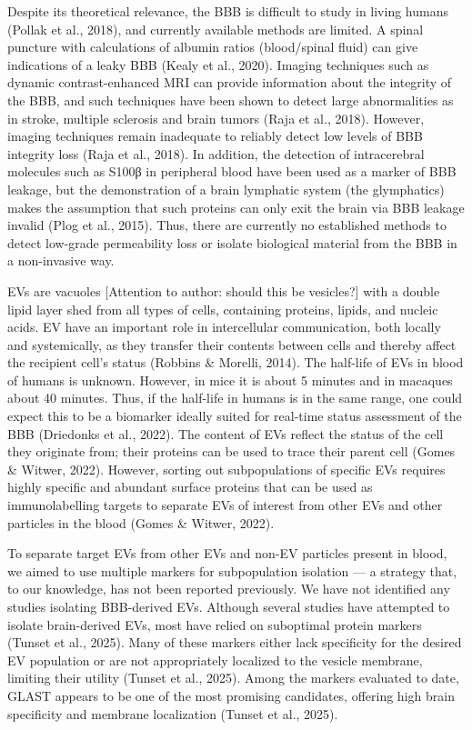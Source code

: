 \documentclass[authordate, empirical]{jote-new-article}
\begin{document}
	Despite its theoretical relevance, the BBB is difficult to study in living humans (Pollak et al., 2018), and currently available methods are limited. A spinal puncture with calculations of albumin ratios (blood/spinal fluid) can give indications of a leaky BBB (Kealy et al., 2020). Imaging techniques such as dynamic contrast-enhanced MRI can provide information about the integrity of the BBB, and such techniques have been shown to detect large abnormalities as in stroke, multiple sclerosis and brain tumors (Raja et al., 2018). However, imaging techniques remain inadequate to reliably detect low levels of BBB integrity loss (Raja et al., 2018). In addition, the detection of intracerebral molecules such as S100β in peripheral blood have been used as a marker of BBB leakage, but the demonstration of a brain lymphatic system (the glymphatics) makes the assumption that such proteins can only exit the brain via BBB leakage invalid (Plog et al., 2015). Thus, there are currently no established methods to detect low-grade permeability loss or isolate biological material from the BBB in a non-invasive way.



	EVs are vacuoles [Attention to author: should this be vesicles?] with a double lipid layer shed from all types of cells, containing proteins, lipids, and nucleic acids. EV have an important role in intercellular communication, both locally and systemically, as they transfer their contents between cells and thereby affect the recipient cell's status (Robbins \& Morelli, 2014). The half-life of EVs in blood of humans is unknown. However, in mice it is about 5 minutes and in macaques about 40 minutes. Thus, if the half-life in humans is in the same range, one could expect this to be a biomarker ideally suited for real-time status assessment of the BBB (Driedonks et al., 2022). The content of EVs reflect the status of the cell they originate from; their proteins can be used to trace their parent cell (Gomes \& Witwer, 2022). However, sorting out subpopulations of specific EVs requires highly specific and abundant surface proteins that can be used as immunolabelling targets to separate EVs of interest from other EVs and other particles in the blood (Gomes \& Witwer, 2022).



	To separate target EVs from other EVs and non-EV particles present in blood, we aimed to use multiple markers for subpopulation isolation — a strategy that, to our knowledge, has not been reported previously. We have not identified any studies isolating BBB-derived EVs. Although several studies have attempted to isolate brain-derived EVs, most have relied on suboptimal protein markers (Tunset et al., 2025). Many of these markers either lack specificity for the desired EV population or are not appropriately localized to the vesicle membrane, limiting their utility (Tunset et al., 2025). Among the markers evaluated to date, GLAST appears to be one of the most promising candidates, offering high brain specificity and membrane localization (Tunset et al., 2025).
\end{document}
